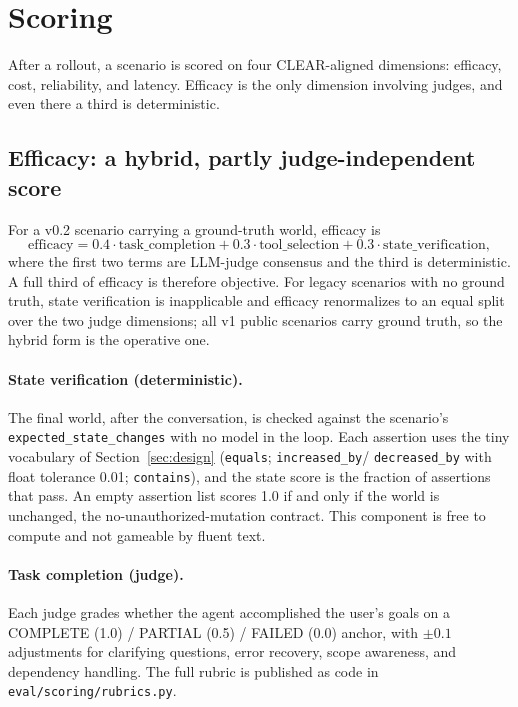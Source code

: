 \section{Scoring}
\label{sec:scoring}

After a rollout, a scenario is scored on four CLEAR-aligned dimensions: efficacy,
cost, reliability, and latency. Efficacy is the only dimension involving judges,
and even there a third is deterministic.

\subsection{Efficacy: a hybrid, partly judge-independent score}

For a v0.2 scenario carrying a ground-truth world, efficacy is
\begin{equation}
\text{efficacy} = 0.4 \cdot \text{task\_completion} + 0.3 \cdot \text{tool\_selection} + 0.3 \cdot \text{state\_verification},
\end{equation}
where the first two terms are LLM-judge consensus and the third is deterministic.
A full third of efficacy is therefore objective. For legacy scenarios with no
ground truth, state verification is inapplicable and efficacy renormalizes to an
equal split over the two judge dimensions; all v1 public scenarios carry ground
truth, so the hybrid form is the operative one.

\paragraph{State verification (deterministic).} The final world, after the
conversation, is checked against the scenario's \texttt{expected\_state\_changes}
with no model in the loop. Each assertion uses the tiny vocabulary of
Section~\ref{sec:design} (\texttt{equals}; \texttt{increased\_by}/%
\texttt{decreased\_by} with float tolerance 0.01; \texttt{contains}), and the state
score is the fraction of assertions that pass. An empty assertion list scores 1.0
if and only if the world is unchanged, the no-unauthorized-mutation contract. This
component is free to compute and not gameable by fluent text.

\paragraph{Task completion (judge).} Each judge grades whether the agent
accomplished the user's goals on a COMPLETE (1.0) / PARTIAL (0.5) / FAILED (0.0)
anchor, with $\pm0.1$ adjustments for clarifying questions, error recovery, scope
awareness, and dependency handling. The full rubric is published as code in
\texttt{eval/scoring/rubrics.py}.

